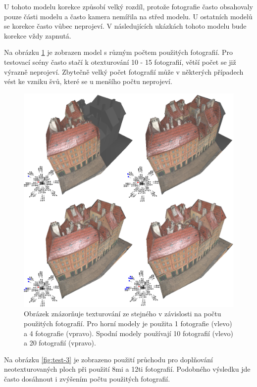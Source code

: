 \documentclass[11pt,twoside,a4paper]{book}
\begin{document}
U tohoto modelu korekce způsobí velký rozdíl, protože fotografie často obsahovaly pouze části modelu a často kamera nemířila na střed modelu. U ostatních modelů se korekce často vůbec neprojeví. V následujících ukázkách tohoto modelu bude korekce vždy zapnutá.

Na obrázku \ref{fig:test-2} je zobrazen model s různým počtem použitých fotografií. Pro testovací scény často stačí k otexturování 10 - 15 fotografií, větší počet se již výrazně neprojeví. Zbytečně velký počet fotografií může v některých případech vést ke vzniku švů, které se u menšího počtu neprojeví. 

\begin{figure}[h!]
\begin{center}
\includegraphics[width=\textwidth]{figures/test-2}
\caption{Obrázek znázorňuje texturování ze stejného v závislosti na počtu použitých fotografií. Pro horní modely je použita 1 fotografie (vlevo) a 4 fotografie (vpravo). Spodní modely používají 10 fotografií (vlevo) a 20 fotografií (vpravo).}
\label{fig:test-2}
\end{center}
\end{figure}

Na  obrázku \ref{fig:test-3} je zobrazeno použití průchodu pro doplňování neotexturovaných ploch při použití 8mi a 12ti fotografií. Podobného výsledku jde často dosáhnout i zvýšením počtu použitých fotografií.
\end{document}
